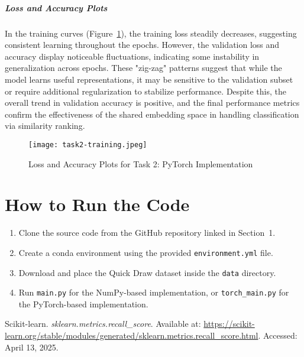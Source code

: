 \documentclass[10pt,a4paper,twoside]{article}
\begin{document}
\subparagraph{Loss and Accuracy Plots}
In the training curves (Figure~\ref{fig:task2_torch_training}), the training loss steadily decreases, suggesting consistent learning throughout the epochs. However, the validation loss and accuracy display noticeable fluctuations, indicating some instability in generalization across epochs. These "zig-zag" patterns suggest that while the model learns useful representations, it may be sensitive to the validation subset or require additional regularization to stabilize performance. Despite this, the overall trend in validation accuracy is positive, and the final performance metrics confirm the effectiveness of the shared embedding space in handling classification via similarity ranking.



\begin{figure}[h]
    \centering
    \texttt{[image: task2-training.jpeg]} 
    \caption{Loss and Accuracy Plots for Task 2: PyTorch Implementation}
    \label{fig:task2_torch_training}
\end{figure}


\section{How to Run the Code}

\begin{enumerate}
    \item Clone the source code from the GitHub repository linked in Section~1.
    \item Create a conda environment using the provided \texttt{environment.yml} file.
    \item Download and place the Quick Draw dataset inside the \texttt{data} directory.
    \item Run \texttt{main.py} for the NumPy-based implementation, or \texttt{torch\_main.py} for the PyTorch-based implementation.
\end{enumerate}


\begin{thebibliography}{9}

Scikit-learn. \textit{sklearn.metrics.recall\_score}.  
Available at: \url{https://scikit-learn.org/stable/modules/generated/sklearn.metrics.recall_score.html}.  
Accessed: April 13, 2025.
\end{thebibliography}
\end{document}
